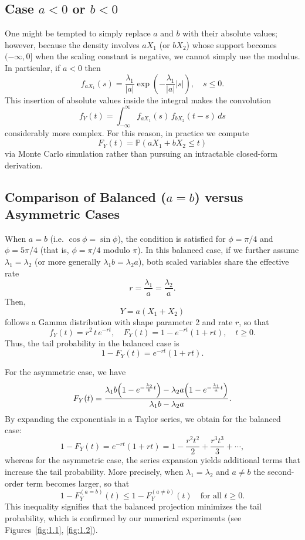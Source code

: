 \subsection{Case \(a<0\) or \(b<0\)}
One might be tempted to simply replace \(a\) and \(b\) with their absolute values; however, because the density involves \(aX_1\) (or \(bX_2\)) whose support becomes \((-\infty,0]\) when the scaling constant is negative, we cannot simply use the modulus. In particular, if \(a<0\) then
\[
f_{aX_1}(s)=\frac{\lambda_1}{|a|}\exp\left(-\frac{\lambda_1}{|a|}|s|\right),\quad s\le0.
\]
This insertion of absolute values inside the integral makes the convolution
\[
f_Y(t)=\int_{-\infty}^{\infty} f_{aX_1}(s)\,f_{bX_2}(t-s)\,ds
\]
considerably more complex. For this reason, in practice we compute
\[
F_Y(t)=\mathbb{P}(aX_1+bX_2\le t)
\]
via Monte Carlo simulation rather than pursuing an intractable closed-form derivation.

\subsection{Comparison of Balanced (\(a=b\)) versus Asymmetric Cases}
When \(a=b\) (i.e. \(\cos\phi=\sin\phi\)), the condition is satisfied for \(\phi=\pi/4\) and \(\phi=5\pi/4\) (that is, \(\phi=\pi/4\) modulo \(\pi\)). In this balanced case, if we further assume \(\lambda_1=\lambda_2\) (or more generally \(\lambda_1b=\lambda_2a\)), both scaled variables share the effective rate
\[
r=\frac{\lambda_1}{a}=\frac{\lambda_2}{a}.
\]
Then,
\[
Y=a(X_1+X_2)
\]
follows a Gamma distribution with shape parameter 2 and rate \(r\), so that
\[
f_Y(t)=r^2\,t\,e^{-rt},\quad F_Y(t)=1-e^{-rt}(1+rt),\quad t\ge0.
\]
Thus, the tail probability in the balanced case is
\[
1-F_Y(t)=e^{-rt}(1+rt).
\]

For the asymmetric case, we have
\[
F_Y(t)=\frac{\lambda_1b\Bigl(1-e^{-\frac{\lambda_2}{b}t}\Bigr)-\lambda_2a\Bigl(1-e^{-\frac{\lambda_1}{a}t}\Bigr)}{\lambda_1b-\lambda_2a}.
\]
By expanding the exponentials in a Taylor series, we obtain for the balanced case:
\[
1-F_Y(t)=e^{-rt}(1+rt)=1-\frac{r^2t^2}{2}+\frac{r^3t^3}{3}+\cdots,
\]
whereas for the asymmetric case, the series expansion yields additional terms that increase the tail probability. More precisely, when \(\lambda_1=\lambda_2\) and \(a\neq b\) the second-order term becomes larger, so that
\[
1-F_Y^{(a=b)}(t) \le 1-F_Y^{(a\neq b)}(t) \quad \text{for all } t\ge0.
\]
This inequality signifies that the balanced projection minimizes the tail probability, which is confirmed by our numerical experiments (see Figures~\ref{fig:1.1}, \ref{fig:1.2}).

